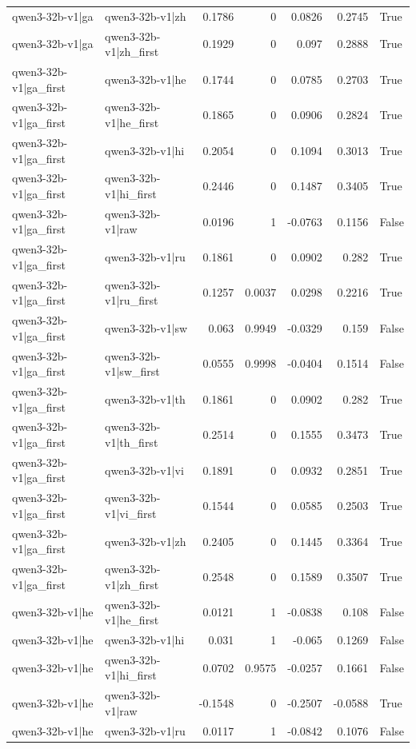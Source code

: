 \begin{table}
\begin{tabular}{l l r r r r l}
qwen3-32b-v1|ga & qwen3-32b-v1|zh & 0.1786 & 0 & 0.0826 & 0.2745 & True \\
qwen3-32b-v1|ga & qwen3-32b-v1|zh_first & 0.1929 & 0 & 0.097 & 0.2888 & True \\
qwen3-32b-v1|ga_first & qwen3-32b-v1|he & 0.1744 & 0 & 0.0785 & 0.2703 & True \\
qwen3-32b-v1|ga_first & qwen3-32b-v1|he_first & 0.1865 & 0 & 0.0906 & 0.2824 & True \\
qwen3-32b-v1|ga_first & qwen3-32b-v1|hi & 0.2054 & 0 & 0.1094 & 0.3013 & True \\
qwen3-32b-v1|ga_first & qwen3-32b-v1|hi_first & 0.2446 & 0 & 0.1487 & 0.3405 & True \\
qwen3-32b-v1|ga_first & qwen3-32b-v1|raw & 0.0196 & 1 & -0.0763 & 0.1156 & False \\
qwen3-32b-v1|ga_first & qwen3-32b-v1|ru & 0.1861 & 0 & 0.0902 & 0.282 & True \\
qwen3-32b-v1|ga_first & qwen3-32b-v1|ru_first & 0.1257 & 0.0037 & 0.0298 & 0.2216 & True \\
qwen3-32b-v1|ga_first & qwen3-32b-v1|sw & 0.063 & 0.9949 & -0.0329 & 0.159 & False \\
qwen3-32b-v1|ga_first & qwen3-32b-v1|sw_first & 0.0555 & 0.9998 & -0.0404 & 0.1514 & False \\
qwen3-32b-v1|ga_first & qwen3-32b-v1|th & 0.1861 & 0 & 0.0902 & 0.282 & True \\
qwen3-32b-v1|ga_first & qwen3-32b-v1|th_first & 0.2514 & 0 & 0.1555 & 0.3473 & True \\
qwen3-32b-v1|ga_first & qwen3-32b-v1|vi & 0.1891 & 0 & 0.0932 & 0.2851 & True \\
qwen3-32b-v1|ga_first & qwen3-32b-v1|vi_first & 0.1544 & 0 & 0.0585 & 0.2503 & True \\
qwen3-32b-v1|ga_first & qwen3-32b-v1|zh & 0.2405 & 0 & 0.1445 & 0.3364 & True \\
qwen3-32b-v1|ga_first & qwen3-32b-v1|zh_first & 0.2548 & 0 & 0.1589 & 0.3507 & True \\
qwen3-32b-v1|he & qwen3-32b-v1|he_first & 0.0121 & 1 & -0.0838 & 0.108 & False \\
qwen3-32b-v1|he & qwen3-32b-v1|hi & 0.031 & 1 & -0.065 & 0.1269 & False \\
qwen3-32b-v1|he & qwen3-32b-v1|hi_first & 0.0702 & 0.9575 & -0.0257 & 0.1661 & False \\
qwen3-32b-v1|he & qwen3-32b-v1|raw & -0.1548 & 0 & -0.2507 & -0.0588 & True \\
qwen3-32b-v1|he & qwen3-32b-v1|ru & 0.0117 & 1 & -0.0842 & 0.1076 & False \\

\end{tabular}
\end{table}
